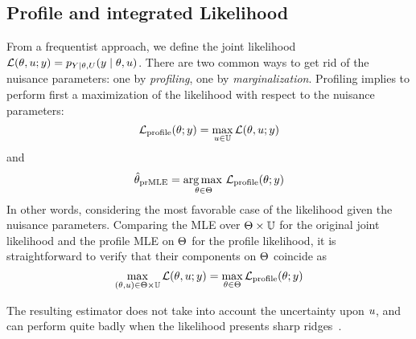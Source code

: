 \documentclass[../../Main_ManuscritThese.tex]{subfiles}
\begin{document}
\subsection{Profile and integrated Likelihood}
From a frequentist approach, we define the joint likelihood $\mathcal{L}(\theta, u ;y) = p_{Y\mid \theta,U}(y \mid \theta, u)$. There are two common ways to get rid of the nuisance parameters: one by \emph{profiling}, one by \emph{marginalization}.
Profiling implies to perform first a maximization of the likelihood with respect to the nuisance parameters:
\begin{equation}
  \label{eq:eq:def_profile_lik}
  \mathcal{L}_{\mathrm{profile}}(\theta;y) = \max_{u \in \mathbb{U}} \mathcal{L}(\theta,u;y)
\end{equation}
and
\begin{equation}
  \hat{\theta}_{\mathrm{prMLE}} = \operatorname*{arg\,max \,}_{\theta\in\Theta} \mathcal{L}_{\mathrm{profile}}(\theta;y)
\end{equation}
In other words, considering the most favorable case of the likelihood given the nuisance parameters.
Comparing the MLE over $\Theta \times \mathbb{U}$ for the original joint likelihood and the profile MLE on $\Theta$ for the profile likelihood, it is straightforward to verify that their components on $\Theta$ coincide as
\begin{equation}
  \max_{(\theta ,u) \in \Theta\times \mathbb{U}} \mathcal{L}(\theta,u;y) = \max_{\theta\in \Theta} \mathcal{L}_{\mathrm{profile}}(\theta;y)
\end{equation}

The resulting estimator does not take into account the uncertainty upon $u$, and can perform quite badly when the likelihood presents sharp ridges~\cite{berger_integrated_1999}.
\end{document}
